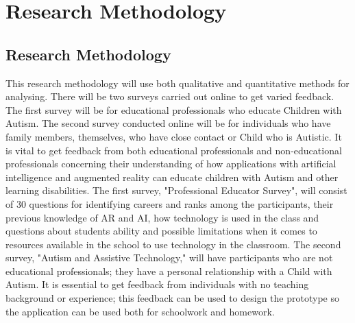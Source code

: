 \chapter{Research Methodology}
\label{chap:Research Methodology}

\section{Research Methodology}
This research methodology will use both qualitative and quantitative methods 
for analysing. There will be two surveys carried out online to get varied feedback. The first survey will be for educational professionals who educate Children with Autism. The second survey conducted online will be for individuals who have family members, themselves, who have close contact or Child who is Autistic. It is vital to get feedback from both educational professionals and non-educational professionals concerning their understanding of how applications with artificial intelligence and augmented reality can educate children with Autism and other learning disabilities. The first survey, "Professional Educator Survey", will consist of 30 questions for identifying careers and ranks among the participants, their previous knowledge of AR and AI, how technology is used in the class and questions about students ability and possible limitations when it comes to resources available in the school to use technology in the classroom. The second survey, "Autism and Assistive Technology," will have participants who are not educational professionals; they have a personal relationship with a Child with Autism. It is essential to get feedback from individuals with no teaching background or experience; this feedback can be used to design the prototype so the application can be used both for schoolwork and homework.


